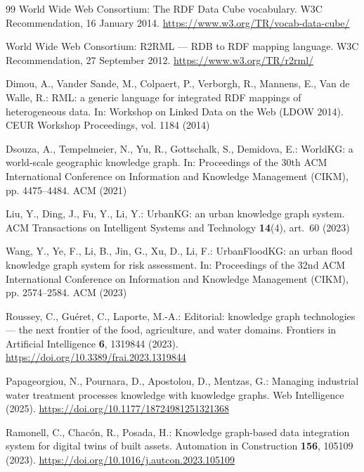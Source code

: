 \documentclass[runningheads]{llncs}
\renewcommand{\_}{\origunderscore\allowbreak}
\begin{document}
\begin{thebibliography}{99}
 World Wide Web Consortium: The RDF Data Cube vocabulary. W3C Recommendation, 16 January 2014. \url{https://www.w3.org/TR/vocab-data-cube/}

 World Wide Web Consortium: R2RML --- RDB to RDF mapping language. W3C Recommendation, 27 September 2012. \url{https://www.w3.org/TR/r2rml/}

 Dimou, A., Vander Sande, M., Colpaert, P., Verborgh, R., Mannens, E., Van de Walle, R.: RML: a generic language for integrated RDF mappings of heterogeneous data. In: Workshop on Linked Data on the Web (LDOW 2014). CEUR Workshop Proceedings, vol. 1184 (2014)

 Dsouza, A., Tempelmeier, N., Yu, R., Gottschalk, S., Demidova, E.: WorldKG: a world-scale geographic knowledge graph. In: Proceedings of the 30th ACM International Conference on Information and Knowledge Management (CIKM), pp. 4475--4484. ACM (2021)

 Liu, Y., Ding, J., Fu, Y., Li, Y.: UrbanKG: an urban knowledge graph system. ACM Transactions on Intelligent Systems and Technology \textbf{14}(4), art.\ 60 (2023)

 Wang, Y., Ye, F., Li, B., Jin, G., Xu, D., Li, F.: UrbanFloodKG: an urban flood knowledge graph system for risk assessment. In: Proceedings of the 32nd ACM International Conference on Information and Knowledge Management (CIKM), pp. 2574--2584. ACM (2023)

 Roussey, C., Gu\'eret, C., Laporte, M.-A.: Editorial: knowledge graph technologies --- the next frontier of the food, agriculture, and water domains. Frontiers in Artificial Intelligence \textbf{6}, 1319844 (2023). \url{https://doi.org/10.3389/frai.2023.1319844}

 Papageorgiou, N., Pournara, D., Apostolou, D., Mentzas, G.: Managing industrial water treatment processes knowledge with knowledge graphs. Web Intelligence (2025). \url{https://doi.org/10.1177/18724981251321368}

 Ramonell, C., Chac\'on, R., Posada, H.: Knowledge graph-based data integration system for digital twins of built assets. Automation in Construction \textbf{156}, 105109 (2023). \url{https://doi.org/10.1016/j.autcon.2023.105109}

\end{thebibliography}
\end{document}
